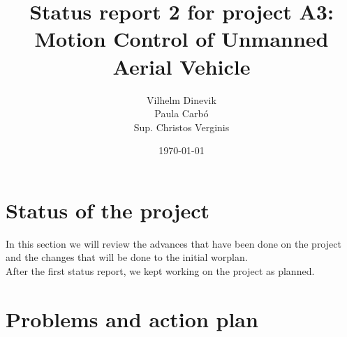 \documentclass{article}
\title{Status report 2 for project A3: Motion Control of Unmanned Aerial Vehicle}
\author{Vilhelm Dinevik \\ Paula Carbó \\ Sup. Christos Verginis}
\date{\today}
\begin{document}
	\maketitle
	
	\bigskip
	\tableofcontents
	\newpage
\section{Status of the project}
In this section we will review the advances that have been done on the project and the changes that will be done to the initial worplan.  \\

%
%
%

After the first status report, we kept working on the project as planned. 

\section{Problems and action plan}
\end{document}
